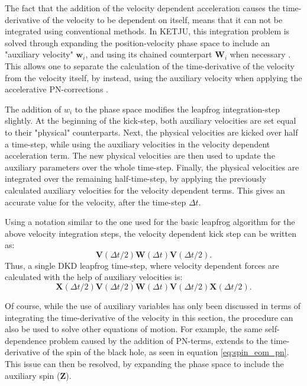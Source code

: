 \documentclass[english, twoside]{HYgradu}
\begin{document}
The fact that the addition of the velocity dependent acceleration causes the time-derivative of the velocity to be dependent on itself, means that it can not be integrated using conventional methods. In KETJU, this integration problem is solved through expanding the position-velocity phase space to include an "auxiliary velocity" $\mathbf{w}_i$, and using its chained counterpart $\mathbf{W}_i$ when necessary \citep{Rantala2017KETJU}. This allows one to separate the calculation of the time-derivative of the velocity from the velocity itself, by instead, using the auxiliary velocity when applying the accelerative PN-corrections \citep{Hellstrom2010, Pihajoki2015}.

The addition of $w_i$ to the phase space modifies the leapfrog integration-step slightly. At the beginning of the kick-step, both auxiliary velocities are set equal to their "physical" counterparts. Next, the physical velocities are kicked over half a time-step, while using the auxiliary velocities in the velocity dependent acceleration term. The new physical velocities are then used to update the auxiliary parameters over the whole time-step. Finally, the physical velocities are integrated over the remaining half-time-step, by applying the previously calculated auxiliary velocities for the velocity dependent terms. This gives an accurate value for the velocity, after the time-step $\Delta t$.

Using a notation similar to the one used for the basic leapfrog algorithm for the above velocity integration steps, the velocity dependent kick step can be written as:
\begin{equation}
\mathbf{V}(\Delta t/2) \mathbf{W}(\Delta t) \mathbf{V}(\Delta t/2).
\end{equation}
Thus, a single DKD leapfrog time-step, where velocity dependent forces are calculated with the help of auxiliary velocities is:
\begin{equation}
\mathbf{X}(\Delta t/2) \mathbf{V}(\Delta t/2) \mathbf{W}(\Delta t) \mathbf{V}(\Delta t/2) \mathbf{X}(\Delta t/2).
\end{equation}

Of course, while the use of auxiliary variables has only been discussed in terms of integrating the time-derivative of the velocity in this section, the procedure can also be used to solve other equations of motion. For example, the same self-dependence problem caused by the addition of PN-terms, extends to the time-derivative of the spin of the black hole, as seen in equation \ref{eq:spin_eom_pn}. This issue can then be resolved, by expanding the phase space to include the auxiliary spin ($\mathbf{Z}$).
\end{document}
